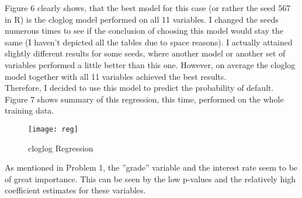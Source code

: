 \documentclass[11pt,a4paper,numbers=endperiod]{article}
\begin{document}
	Figure 6 clearly shows, that the best model for this case (or rather the seed 567 in R) is the cloglog model performed on all 11 variables. I changed the seeds numerous times to see if the conclusion of choosing this model would stay the same (I haven't depicted all the tables due to space reasons). I actually attained slightly different results for some seeds, where another model or another set of variables performed a little better than this one. However, on average the cloglog model together with all 11 variables achieved the best results.\\
	Therefore, I decided to use this model to predict the probability of default.\\
	Figure 7 shows summary of this regression, this time, performed on the whole training data. 
	\begin{figure}[!ht] 
		\centering
		\texttt{[image: reg]}
		\caption{cloglog Regression}
	\end{figure}
	As mentioned in Problem 1, the ''grade'' variable and the interest rate seem to be of great importance. This can be seen by the low p-values and the relatively high coefficient estimates for these variables.  
\end{document}
